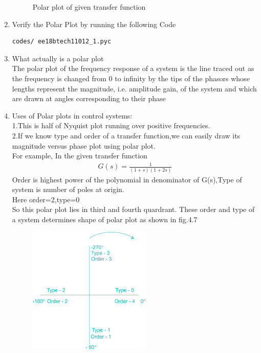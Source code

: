 \begin{enumerate}[label=\thesection.\arabic*.,ref=\thesection.\theenumi]
\begin{figure}
    \caption{Polar plot of given transfer function}
    \label{fig:Graph}
\end{figure}
\item
Verify the Polar Plot by running the following Code\\
\begin{lstlisting}
codes/ ee18btech11012_1.pyc
\end{lstlisting}
\item
What actually is a polar plot\\
The polar plot of the frequency response of a system is the line traced out as the frequency is changed from 0 to infinity by the tips of the phasors whose lengths represent the magnitude, i.e. amplitude gain, of the system and which are drawn at angles corresponding to their phase 
\item
Uses of Polar plots in control systems:\\
1.This is half of Nyquist plot running over positive frequencies.
\\
2.If we know type and order of a transfer function,we can easily draw its magnitude versus phase plot using polar plot.\\
For example,
In the given transfer function\\
\begin{align}
G(s) = \frac{1}{(1+s)(1+2s)}
\end{align}
Order is highest power of the polynomial in denominator of G(s),Type of system is number of poles at origin.\\
Here order=2,type=0\\
So this polar plot lies in third and fourth quardrant.
These order and type of a system determines shape of polar plot as shown in fig.4.7\\
\begin{figure}
    \centering
    \includegraphics[width=0.7\linewidth]{ee18btech11012_4.png}

\end{figure}
\end{enumerate}
